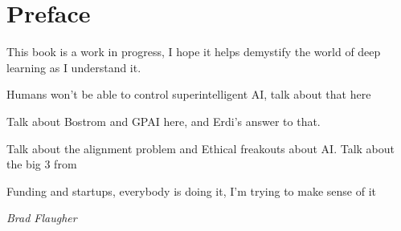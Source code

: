 \chapter*{Preface}

This book is a work in progress, I hope it helps demystify the world of deep learning as I understand it.

Humans won't be able to control superintelligent AI, talk about that here\cite{Andreu2021}

Talk about Bostrom and GPAI here, and Erdi's answer to that. \cite{Erdi2019} \cite{Bostrom2014}

Talk about the alignment problem and Ethical freakouts about AI. Talk about the big 3 from 
\cite{Christian2020}
\cite{Blackman2022Jul}

Funding and startups, everybody is doing it, I'm trying to make sense of it


\begin{flushright}
	\textit{Brad Flaugher}
\end{flushright}
